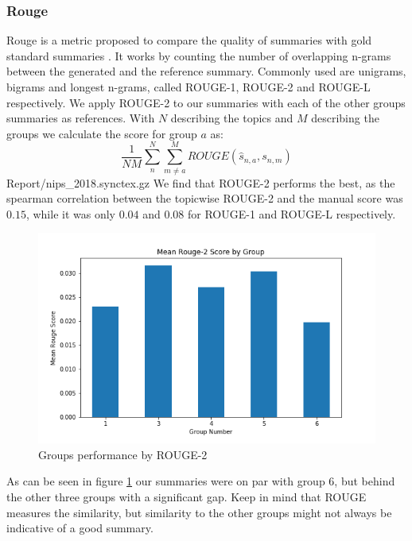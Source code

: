 \subsubsection{Rouge}
Rouge is a metric proposed to compare the quality of summaries with gold standard summaries \cite{lin2004rouge}. It works by counting the number of overlapping n-grams between the generated and the reference summary. Commonly used are unigrams, bigrams and longest n-grams, called ROUGE-1, ROUGE-2 and ROUGE-L respectively. We apply ROUGE-2 to our summaries with each of the other groups summaries as references. With $N$ describing the topics and $M$ describing the groups we calculate the score for group $a$ as:
$$\frac{1}{NM} \sum^N_{n} \sum^M_{m\neq a} ROUGE(\hat{s}_{n,a}, s_{n,m}) $$Report/nips_2018.synctex.gz
We find that ROUGE-2 performs the best, as the spearman correlation between the topicwise ROUGE-2 and the manual score was $0.15$, while it was only $0.04$ and $0.08$ for ROUGE-1 and ROUGE-L respectively.

\begin{figure}[!ht]
	\centering
	\includegraphics[width=0.55\linewidth]{../evaluation/meanrouge.png}
	\caption{Groups performance by ROUGE-2}
	\label{fig:rouge}
\end{figure}

As can be seen in figure \ref{fig:rouge} our summaries were on par with group 6, but behind the other three groups with a significant gap. Keep in mind that ROUGE measures the similarity, but similarity to the other groups might not always be indicative of a good summary. 